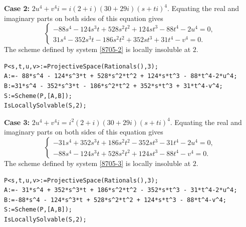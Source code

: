 \documentclass[a4paper,12pt,english,reqno]{amsart}
\begin{document}
{\bf Case 2:} $2u^4+v^4i=i(2+i)(30+29i)(s+ti)^4$. Equating the real and imaginary parts on both sides of this equation gives
\begin{equation}\label{8705-2}
\begin{cases}
-88s^4 - 124s^3t + 528s^2t^2 + 124st^3 - 88t^4 - 2u^4=0,\\
31s^4 - 352s^3t - 186s^2t^2 + 352st^3 + 31t^4 - v^4=0.
\end{cases}
\end{equation}
The scheme defined by system \eqref{8705-2} is locally insoluble at $2$.


\begin{lstlisting}
P<s,t,u,v>:=ProjectiveSpace(Rationals(),3);
A:=- 88*s^4 - 124*s^3*t + 528*s^2*t^2 + 124*s*t^3 - 88*t^4-2*u^4;
B:=31*s^4 - 352*s^3*t - 186*s^2*t^2 + 352*s*t^3 + 31*t^4-v^4;
S:=Scheme(P,[A,B]);
IsLocallySolvable(S,2);
\end{lstlisting}

{\bf Case 3:} $2u^4+v^4i=i^2(2+i)(30+29i)(s+ti)^4$. Equating the real and imaginary parts on both sides of this equation gives
\begin{equation}\label{8705-3}
\begin{cases}
-31s^4 + 352s^3t + 186s^2t^2 - 352st^3 - 31t^4 - 2u^4=0,\\
-88s^4 - 124s^3t + 528s^2t^2 + 124st^3 - 88t^4 - v^4=0.
\end{cases}
\end{equation}
The scheme defined by system \eqref{8705-3} is locally insoluble at $2$.

\begin{lstlisting}
P<s,t,u,v>:=ProjectiveSpace(Rationals(),3);
A:=- 31*s^4 + 352*s^3*t + 186*s^2*t^2 - 352*s*t^3 - 31*t^4-2*u^4;
B:=-88*s^4 - 124*s^3*t + 528*s^2*t^2 + 124*s*t^3 - 88*t^4-v^4;
S:=Scheme(P,[A,B]);
IsLocallySolvable(S,2);
\end{lstlisting}
\end{document}
